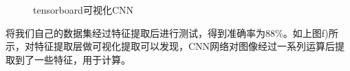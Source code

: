 \documentclass[UTF8, a4paper, 12pt]{report}
\begin{document}
\begin{figure}[!h]
{		}
		\quad
		\quad
		\caption{tensorboard可视化CNN}
		\end{figure}

		将我们自己的数据集经过特征提取后进行测试，得到准确率为88\%。如上图f)所示，对特征提取层做可视化提取可以发现，CNN网络对图像经过一系列运算后提取到了一些特征，用于计算。
\clearpage
\end{document}
